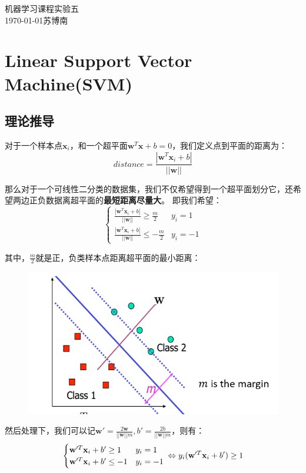\documentclass{article}
\begin{document}
\begin{center}
    \huge{机器学习课程实验五}\\
    \large{\today \quad 苏博南}
\end{center}
\section{Linear Support Vector Machine(SVM)}
\subsection{理论推导}

对于一个样本点$\textbf{x}_i$，和一个超平面$\textbf{w}^T\textbf{x}+b=0$，我们定义点到平面的距离为：
\begin{equation}
	distance=\frac{|\textbf{w}^T\textbf{x}_i+b|}{||\textbf{w}||}
\end{equation}

那么对于一个可线性二分类的数据集，我们不仅希望得到一个超平面划分它，还希望两边正负数据离超平面的\textbf{最短距离尽量大}。
即我们希望：
\begin{equation}
	\begin{cases}
		\frac{|\textbf{w}^T\textbf{x}_i+b|}{||\textbf{w}||}\geq\frac{m}{2} & y_i=1\\
		\frac{|\textbf{w}^T\textbf{x}_i+b|}{||\textbf{w}||}\leq-\frac{m}{2} & y_i=-1
	\end{cases}
\end{equation}

其中，$\frac{m}{2}$就是正，负类样本点距离超平面的最小距离：
\begin{figure}[H]
	\centering
	\includegraphics[width=0.6\linewidth]{4.png}
\end{figure}

然后处理下，我们可以记$\textbf{w}'=\frac{2\textbf{w}}{||\textbf{w}||m},b'=\frac{2b}{||\textbf{w}||m}$，则有：
\begin{equation}
	\begin{cases}
		\textbf{w}'^T\textbf{x}_i+b'\geq 1 & y_i=1\\
		\textbf{w}'^T\textbf{x}_i+b'\leq-1 & y_i=-1
	\end{cases}\\
	\Leftrightarrow y_i(\textbf{w}'^T\textbf{x}_i+b')\geq 1
\end{equation}
\end{document}
